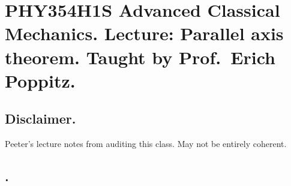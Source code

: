 
%

\chapter{PHY354H1S Advanced Classical Mechanics.  Lecture: Parallel axis theorem.  Taught by Prof.\ Erich Poppitz.}
\label{chap:parallelAxisTheorem}
{}
\date{Mar XX, 2012}

\beginArtWithToc

\section{Disclaimer.}

Peeter's lecture notes from auditing this class.  May not be entirely coherent.

\section{.}

\EndArticle
